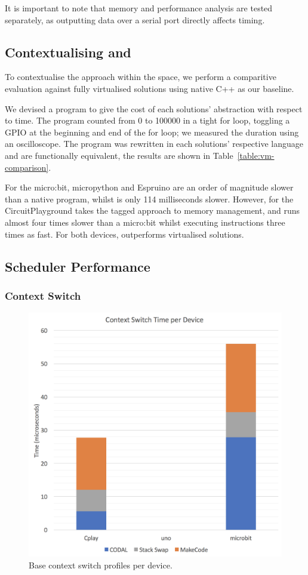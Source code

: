 It is important to note that memory and performance analysis are tested separately, as outputting data over a serial port directly affects timing.

\subsection{Contextualising \MC and \CO}

To contextualise the \MC approach within the space, we perform a comparitive evaluation against fully virtualised solutions using native C++ as our baseline.

We devised a program to give the cost of each solutions' abstraction with respect to time. The program counted from 0 to 100000 in a tight for loop, toggling a GPIO at the beginning and end of the for loop; we measured the duration using an oscilloscope. The program was rewritten in each solutions' respective language and are functionally equivalent, the results are shown in Table~\ref{table:vm-comparison}.

For the micro:bit, micropython and Espruino are an order of magnitude slower than a native \CO program, whilst \MC is only 114 milliseconds slower. However, \MC for the CircuitPlayground takes the tagged approach to memory management, and runs almost four times slower than a micro:bit whilst executing instructions three times as fast. For both devices, \MC outperforms virtualised solutions.

\subsection{Scheduler Performance}

\subsubsection{Context Switch}

\begin{figure}[ht]
    \includegraphics[width=.6\columnwidth]{images/context-switch.png}
\caption{\label{fig:context-switch}Base context switch profiles per device.}
\end{figure}

